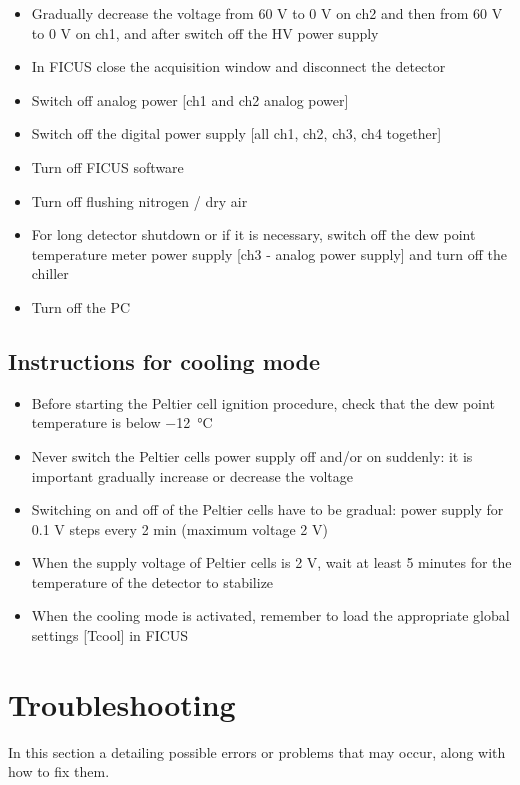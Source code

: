 \documentclass[a4paper,12pt,oneside,pdflatex,italian,final,twocolumn]{article}
\begin{document}
    \begin{itemize}
        \item Gradually decrease the voltage from 60 V to 0 V on ch2 and then from 60 V to 0 V on ch1, and after switch off the HV power supply 
        \item In FICUS close the acquisition window and disconnect the detector
        \item Switch off analog power [ch1 and ch2 analog power]
        \item Switch off the digital power supply [all ch1, ch2, ch3, ch4 together]
        \item Turn off FICUS software
        \item Turn off flushing nitrogen / dry air 
        \item For long detector shutdown or if it is necessary, switch off the dew point temperature meter power supply [ch3 - analog power supply] and turn off the chiller
        \item Turn off the PC
    \end{itemize}
    
    \subsection{Instructions for cooling mode} 
     \begin{itemize}
        \item Before starting the Peltier cell ignition procedure, check that the dew point temperature is below \SI{-12}{\celsius}
        \item Never switch the Peltier cells power supply off and/or on suddenly: it is important gradually increase or decrease the voltage
        \item Switching on and off of the Peltier cells have to be gradual: power supply for 0.1 V steps every 2 min (maximum voltage 2 V)
        \item When the supply voltage of Peltier cells is 2 V, wait at least 5 minutes for the temperature of the detector to stabilize
        \item When the cooling mode is activated, remember to load the appropriate global settings [Tcool] in FICUS
    \end{itemize}   
    
\section{Troubleshooting}
In this section a detailing possible errors or problems that may occur, along with how to fix them.
\end{document}
